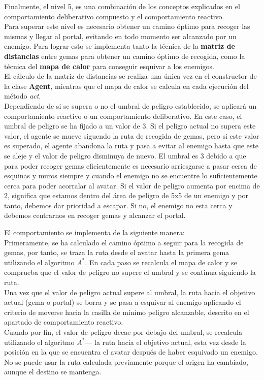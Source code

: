Finalmente, el nivel 5, es una combinación de los conceptos explicados en el comportamiento deliberativo compuesto y el comportamiento reactivo.\\
Para superar este nivel es necesario obtener un camino óptimo para recoger las mismas y llegar al portal, evitando en todo momento ser alcanzado por un enemigo. Para lograr esto se implementa tanto la técnica de la \textbf{matriz de distancias} entre gemas para obtener un camino óptimo de recogida, como la técnica del \textbf{mapa de calor} para conseguir esquivar a los enemigos.\\
El cálculo de la matriz de distancias se realiza una única vez en el constructor de la clase \textbf{Agent}, mientras que el mapa de calor se calcula en cada ejecución del método \emph{act}.\\

Dependiendo de si se supera o no el umbral de peligro establecido, se aplicará un comportamiento reactivo o un comportamiento deliberativo. En este caso, el umbral de peligro se ha fijado a un valor de 3. Si el peligro actual no supera este valor, el agente se mueve siguendo la ruta de recogida de gemas, pero si este valor es superado, el agente abandona la ruta y pasa a evitar al enemigo hasta que este se aleje y el valor de peligro disminuya de nuevo. El umbral es 3 debido a que para poder recoger gemas eficientemente es necesario arriesgarse a pasar cerca de esquinas y muros siempre y cuando el enemigo no se encuentre lo suficientemente cerca para poder acorralar al avatar. Si el valor de peligro aumenta por encima de 2, significa que estamos dentro del área de peligro de 5x5 de un enemigo y por tanto, debemos dar prioridad a escapar. Si no, el enemigo no esta cerca y debemos centrarnos en recoger gemas y alcanzar el portal.

El comportamiento se implementa de la siguiente manera:\\
Primeramente, se ha calculado el camino óptimo a seguir para la recogida de gemas, por tanto, se traza la ruta desde el avatar hasta la primera gema utilizando el algoritmo $ A^{*} $. En cada paso se recalcula el mapa de calor y se comprueba que el valor de peligro no supere el umbral y se continua siguiendo la ruta.\\
Una vez que el valor de peligro actual supere al umbral, la ruta hacia el objetivo actual (gema o portal) se borra y se pasa a esquivar al enemigo aplicando el criterio de moverse hacia la casilla de mínimo peligro alcanzable, descrito en el apartado de comportamiento reactivo.\\
Cuando por fin, el valor de peligro decae por debajo del umbral, se recalcula ---utilizando el algoritmo $ A^{*} $--- la ruta hacia el objetivo actual, esta vez desde la posición en la que se encuentra el avatar después de haber esquivado un enemigo. No se puede usar la ruta calculada previamente porque el origen ha cambiado, aunque el destino se mantenga.\\

